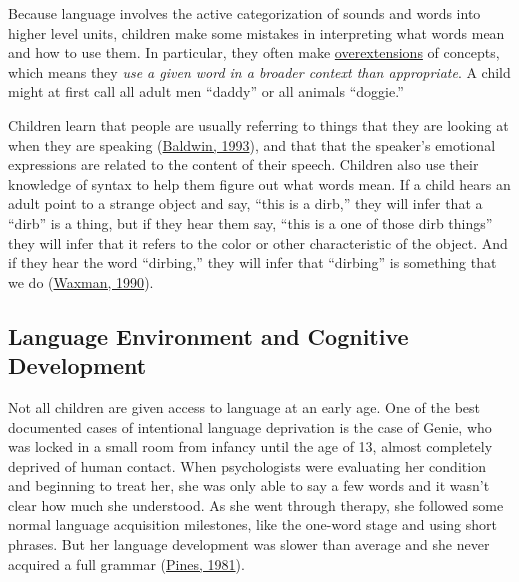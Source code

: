 \documentclass[
]{krantz}
\begin{document}
Because language involves the active categorization of sounds and words into higher level units, children make some mistakes in interpreting what words mean and how to use them. In particular, they often make \protect\hyperlink{overextensions}{overextensions} of concepts, which means they \emph{use a given word in a broader context than appropriate}. A child might at first call all adult men ``daddy'' or all animals ``doggie.''

Children learn that people are usually referring to things that they are looking at when they are speaking (\protect\hyperlink{ref-Baldwin1993}{Baldwin, 1993}), and that that the speaker's emotional expressions are related to the content of their speech. Children also use their knowledge of syntax to help them figure out what words mean. If a child hears an adult point to a strange object and say, ``this is a dirb,'' they will infer that a ``dirb'' is a thing, but if they hear them say, ``this is a one of those dirb things'' they will infer that it refers to the color or other characteristic of the object. And if they hear the word ``dirbing,'' they will infer that ``dirbing'' is something that we do (\protect\hyperlink{ref-Waxman1990}{Waxman, 1990}).

\hypertarget{language-environment-and-cognitive-development}{%
\subsection*{Language Environment and Cognitive Development}\label{language-environment-and-cognitive-development}}


Not all children are given access to language at an early age. One of the best documented cases of intentional language deprivation is the case of Genie, who was locked in a small room from infancy until the age of 13, almost completely deprived of human contact. When psychologists were evaluating her condition and beginning to treat her, she was only able to say a few words and it wasn't clear how much she understood. As she went through therapy, she followed some normal language acquisition milestones, like the one-word stage and using short phrases. But her language development was slower than average and she never acquired a full grammar (\protect\hyperlink{ref-pines1981}{Pines, 1981}).
\end{document}
